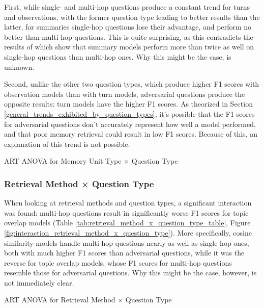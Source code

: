 First, while single- and multi-hop questions produce a constant trend for turns and observations, with the former question type leading to better results than the latter, for summaries single-hop questions lose their advantage, and perform no better than multi-hop questions. This is quite surprising, as this contradicts the results of \cite{Maharana2024} which show that summary models perform more than twice as well on single-hop questions than multi-hop ones. Why this might be the case, is unknown.

Second, unlike the other two question types, which produce higher F1 scores with observation models than with turn models, adversarial questions produce the opposite results: turn models have the higher F1 scores. As theorized in Section \ref{general_trends_exhibited_by_question_types}, it's possible that the F1 scores for adversarial questions don't accurately represent how well a model performed, and that poor memory retrieval could result in low F1 scores. Because of this, an explanation of this trend is not possible.


\begin{table}[h]
\centering
\tiny

\caption{ART ANOVA for Memory Unit Type × Question Type}
\label{tab:memory_unit_type_x_question_type_table}
\end{table}


\subsubsection{Retrieval Method × Question Type}

When looking at retrieval methods and question types, a significant interaction was found: multi-hop questions result in significantly worse F1 scores for topic overlap models (Table \ref{tab:retrieval_method_x_question_type_table}, Figure \ref{fig:interaction_retrieval_method_x_question_type}). More specifically, cosine similarity models handle multi-hop questions nearly as well as single-hop ones, both with much higher F1 scores than adversarial questions, while it was the reverse for topic overlap models, whose F1 scores for multi-hop questions resemble those for adversarial questions. Why this might be the case, however, is not immediately clear.

\begin{table}[h]
\centering
\tiny

\caption{ART ANOVA for Retrieval Method × Question Type}
\label{tab:retrieval_method_x_question_type_table}
\end{table}


